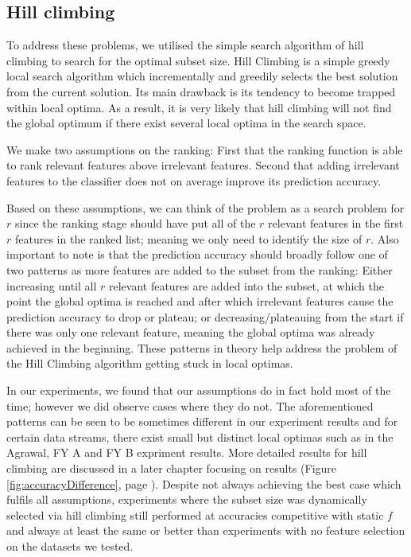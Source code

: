 \subsection{Hill climbing}
To address these problems, we utilised the simple search algorithm of hill climbing to search for the optimal subset size. Hill Climbing is a simple greedy local search algorithm which incrementally and greedily selects the best solution from the current solution. Its main drawback is its tendency to become trapped within local optima. As a result, it is very likely that hill climbing will not find the global optimum if there exist several local optima in the search space.

We make two assumptions on the ranking: First that the ranking function is able to rank relevant features above irrelevant features. Second that adding irrelevant features to the classifier does not on average improve its prediction accuracy. 

Based on these assumptions, we can think of the problem as a search problem for $r$ since the ranking stage should have put all of the $r$ relevant features in the first $r$ features in the ranked list; meaning we only need to identify the size of $r$. Also important to note is that the prediction accuracy should broadly follow one of two patterns as more features are added to the subset from the ranking: Either increasing until all $r$ relevant features are added into the subset, at which the point the global optima is reached and after which irrelevant features cause the prediction accuracy to drop or plateau; or decreasing/plateauing from the start if there was only one relevant feature, meaning the global optima was already achieved in the beginning. These patterns in theory help address the problem of the Hill Climbing algorithm getting stuck in local optimas.

In our experiments, we found that our assumptions do in fact hold most of the time; however we did observe cases where they do not. The aforementioned patterns can be seen to be sometimes different in our experiment results and for certain data streams, there exist small but distinct local optimas such as in the Agrawal, FY A and FY B expriment results. More detailed results for hill climbing are discussed in a later chapter focusing on results (Figure \ref{fig:accuracyDifference}, page \pageref{fig:accuracyDifference}). Despite not always achieving the best case which fulfils all assumptions, experiments where the subset size was dynamically selected via hill climbing still performed at accuracies competitive with static $f$ and always at least the same or better than experiments with no feature selection on the datasets we tested.

